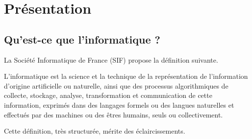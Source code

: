 \chapter{Présentation}
\thispagestyle{empty}
\section{Qu'est-ce que l'informatique ?}
La Société Informatique de France (SIF) propose la définition suivante.
\begin{defin}[informatique]
L'informatique est la science et la technique de la représentation de l'information d'origine artificielle ou naturelle, ainsi que des processus algorithmiques de collecte, stockage, analyse, transformation et communication de cette information, exprimés dans des langages formels ou des langues naturelles et effectués par des machines ou des êtres humains, seuls ou collectivement.
\end{defin}
Cette définition, très structurée, mérite des éclaircissements.
